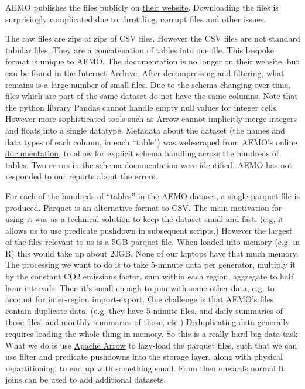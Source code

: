 \ac{AEMO}  publishes the files publicly on \href{https://www.nemweb.com.au/Data_Archive/Wholesale_Electricity/MMSDM/}{their website}. Downloading the files is surprisingly complicated due to throttling, corrupt files and other issues.

The raw files are zips of zips of CSV files. However the CSV files are not standard tabular files. They are a concatenation of tables into one file. This bespoke format is unique to AEMO. The documentation is no longer on their website, but can be found in \href{https://web.archive.org/web/20230414160249/https://aemo.com.au/-/media/files/market-it-systems/guide-to-csv-data-format-standard.pdf?la=en}{the Internet Archive}. After decompressing and filtering, what remains is a large number of small files. Due to the schema changing over time, files which are part of the same dataset do not have the same columns. Note that the python library Pandas cannot handle empty null values for integer cells. However more sophisticated tools such as Arrow cannot implicitly merge integers and floats into a single datatype.
Metadata about the dataset (the names and data types of each column, in each ``table") was webscraped from \href{https://nemweb.com.au/Reports/Current/MMSDataModelReport/Electricity/MMS%20Data%20Model%20Report.htm}{\ac{AEMO}'s online documentation}, to allow for explicit schema handling across the hundreds of tables. Two errors in the schema documentation were identified. \ac{AEMO} has not responded to our reports about the errors.

For each of the hundreds of ``tables'' in the AEMO dataset, a single parquet file is produced. Parquet is an alternative format to CSV. The main motivation for using it was as a technical solution to keep the dataset small and fast. (e.g. it allows us to use predicate pushdown in subsequent scripts.) However the largest of the files relevant to us is a 5GB parquet file. When loaded into memory (e.g. in R) this would take up about 20GB. None of our laptops have that much memory. The processing we want to do is to take 5-minute data per generator, multiply it by the constant CO2 emissions factor, sum within each region, aggregate to half hour intervals. Then it's small enough to join with some other data, e.g. to account for inter-region import-export. One challenge is that AEMO's files contain duplicate data. (e.g. they have 5-minute files, and daily summaries of those files, and monthly summaries of those, etc.) Deduplicating data generally requires loading the whole thing in memory. So this is a really hard big data task. What we do is use \href{https://arrow.apache.org/}{Apache Arrow} to lazy-load the parquet files, such that we can use filter and predicate pushdowns into the storage layer, along with physical repartitioning, to end up with something small. From then onwards normal R joins can be used to add additional datasets.

